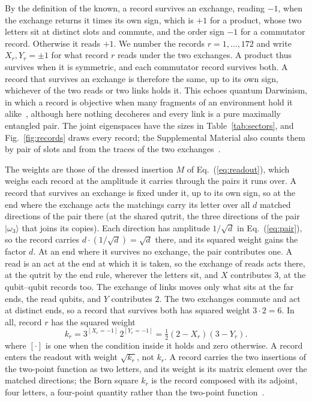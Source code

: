 \documentclass[aps,prl,reprint,superscriptaddress,longbibliography,nofootinbib,floatfix]{revtex4-2}
\theoremstyle{definition}
\newcommand{\ket}[1]{|#1\rangle}
\begin{document}
By the definition of the known, a record survives an exchange, reading $-1$, when the exchange returns it times its own sign, which is $+1$ for a product, whose two letters sit at distinct slots and commute, and the order sign $-1$ for a commutator record. Otherwise it reads $+1$. We number the records $r=1,\dots,172$ and write $X_{r},Y_{r}=\pm 1$ for what record $r$ reads under the two exchanges. A product thus survives when it is symmetric, and each commutator record survives both. A record that survives an exchange is therefore the same, up to its own sign, whichever of the two reads or two links holds it. This echoes quantum Darwinism, in which a record is objective when many fragments of an environment hold it alike~\cite{ollivier2004,zurek2009}, although here nothing decoheres and every link is a pure maximally entangled pair. The joint eigenspaces have the sizes in Table~\ref{tab:sectors}, and Fig.~\ref{fig:records} draws every record; the Supplemental Material also counts them by pair of slots and from the traces of the two exchanges~\cite{SM}.

The weights are those of the dressed insertion $M$ of Eq.~(\ref{eq:readout}), which weighs each record at the amplitude it carries through the pairs it runs over. A record that survives an exchange is fixed under it, up to its own sign, so at the end where the exchange acts the matchings carry its letter over all $d$ matched directions of the pair there (at the shared qutrit, the three directions of the pair $\ket{\omega_{3}}$ that joins its copies). Each direction has amplitude $1/\sqrt{d}$ in Eq.~(\ref{eq:pair}), so the record carries $d\cdot(1/\sqrt{d})=\sqrt{d}$ there, and its squared weight gains the factor $d$. At an end where it survives no exchange, the pair contributes one. A read is an act at the end at which it is taken, so the exchange of reads acts there, at the qutrit by the end rule, wherever the letters sit, and $X$ contributes $3$, at the qubit--qubit records too. The exchange of links moves only what sits at the far ends, the read qubits, and $Y$ contributes $2$. The two exchanges commute and act at distinct ends, so a record that survives both has squared weight $3\cdot 2=6$. In all, record $r$ has the squared weight
\begin{equation}
k_{r} = 3^{[X_{r}=-1]}\,2^{[Y_{r}=-1]} = \tfrac{1}{2}(2-X_{r})(3-Y_{r}).
\label{eq:gain}
\end{equation}
where $[\cdot]$ is one when the condition inside it holds and zero otherwise. A record enters the readout with weight $\sqrt{k_{r}}$, not $k_{r}$. A record carries the two insertions of the two-point function as two letters, and its weight is its matrix element over the matched directions; the Born square $k_{r}$ is the record composed with its adjoint, four letters, a four-point quantity rather than the two-point function~\cite{SM}.
\end{document}
